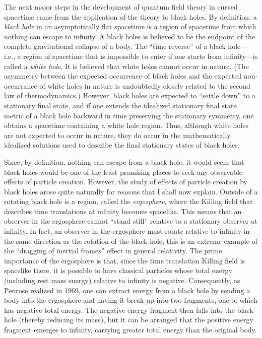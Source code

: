 The next major steps in the development of quantum field theory in
curved spacetime came from the application of the theory to black
holes.  By definition, a {\it black hole} in an asymptotically flat
spacetime is a region of spacetime from which nothing can escape to
infinity. A black holes is believed to be the endpoint of the complete
gravitational collapse of a body.  The ``time reverse'' of a black
hole---i.e., a region of spacetime that is impossible to enter if one
starts from infinity---is called a {\it white hole}. It is believed
that white holes cannot occur in nature. (The asymmetry between the
expected occurrence of black holes and the expected non-occurrance of white
holes in nature is undoubtedly closely related to the second law of
thermodynamics.)  However, black holes are expected to ``settle down''
to a stationary final state, and if one extends the idealized
stationary final state metric of a black hole backward in time
preserving the stationary symmetry, one obtains a spacetime containing a
white hole region. Thus, although white holes are not expected to
occur in nature, they do occur in the mathematically idealized
solutions used to describe the final stationary states of black holes.

Since, by definition, nothing can escape from a black hole, it would
seem that black holes would be one of the least promising places to
seek any observable effects of particle creation. However, the study
of effects of particle creation by black holes arose quite naturally
for reasons that I shall now explain. Outside of a rotating black
hole is a region, called the {\it ergosphere}, where the Killing field
that describes time translations at infinity becomes spacelike. This
means that an observer in the ergosphere cannot ``stand still''
relative to a stationary observer at infinity. In fact, an observer in
the ergosphere must rotate relative to infinity in the same direction
as the rotation of the black hole; this is an extreme example of the
``dragging of inertial frames'' effect in general relativity. The
prime importance of the ergosphere is that, since the time translation
Killing field is spacelike there, it is possible to have classical
particles whose total energy (including rest mass energy) relative to
infinity is negative. Consequently, as Penrose realized in 1969, one
can extract energy from a black hole by sending a body into the
ergosphere and having it break up into two fragments, one of which has
negative total energy. The negative energy fragment then falls into
the black hole (thereby reducing its mass), but it can be arranged
that the positive energy fragment emerges to infinity, carrying
greater total energy than the original body.

